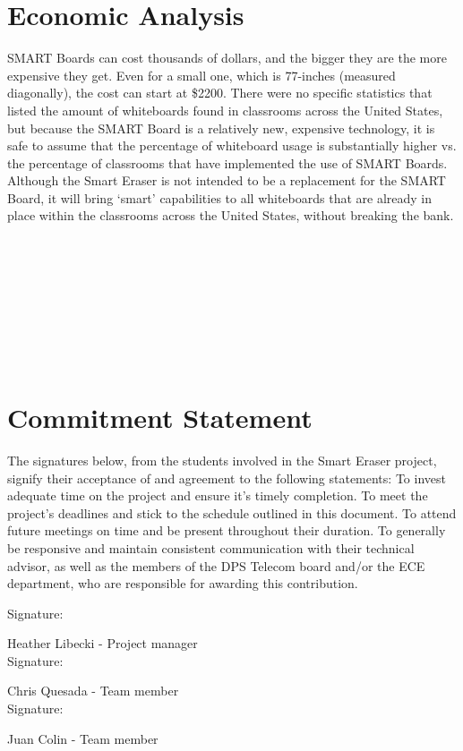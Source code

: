 \documentclass[10pt,onecolumn,draftclsnofoot]{IEEEtran} 					%
\begin{document}
	\section{Economic Analysis}
	\setlength{\parindent}{5ex}
	SMART Boards can cost thousands of dollars, and the bigger they are the more expensive they get. Even for a small one, which is 77-inches (measured diagonally), the cost can start at \$2200. There were no specific statistics that listed the amount of whiteboards found in classrooms across the United States, but because the SMART Board is a relatively new, expensive technology, it is safe to assume that the percentage of whiteboard usage is substantially higher vs. the percentage of classrooms that have implemented the use of SMART Boards. Although the Smart Eraser is not intended to be a replacement for the SMART Board, it will bring {\lq}smart{\rq} capabilities to all whiteboards that are already in place within the classrooms across the United States, without breaking the bank.\\\\\\\\\\\\\\\\\\
	\section{Commitment Statement}
	\setlength{\parindent}{5ex}
	The signatures below, from the students involved in the Smart Eraser project, signify their acceptance of and agreement to the following statements:
	To invest adequate time on the project and ensure it{\rq}s timely completion.
	To meet the project{\rq}s deadlines and stick to the schedule outlined in this document.
	To attend future meetings on time and be present throughout their duration.
	To generally be responsive and maintain consistent communication with their technical advisor, as well as the members of the DPS Telecom board and/or the ECE department, who are responsible for awarding this contribution.\\
	\begin{flushleft}
	Signature: \hrulefill
	
	\hspace*{0mm}\phantom{Approved: }Heather Libecki - Project manager\\
	\vspace{12pt}
	Signature: \hrulefill
	
	\hspace*{0mm}\phantom{Approved: }Chris Quesada - Team member\\
	\vspace{12pt}
	Signature: \hrulefill
	
	\hspace*{0mm}\phantom{Approved: }Juan Colin - Team member\\
	
	\end{flushleft}\par
	\setlength{\parindent}{5ex}
\end{document}
